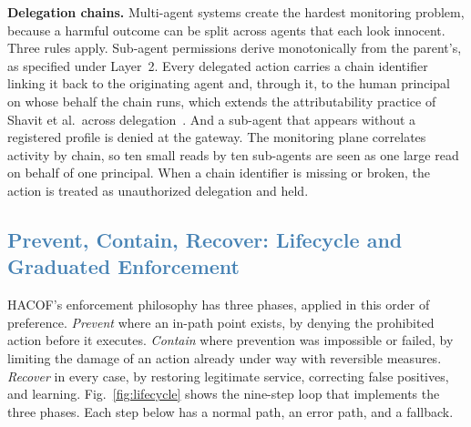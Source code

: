\documentclass[journal]{IEEEtran}
\newcommand{\hacof}{HACOF}
\begin{document}
\textbf{Delegation chains.} Multi-agent systems create the hardest monitoring problem, because a harmful outcome can be split across agents that each look innocent. Three rules apply. Sub-agent permissions derive monotonically from the parent's, as specified under Layer~2. Every delegated action carries a chain identifier linking it back to the originating agent and, through it, to the human principal on whose behalf the chain runs, which extends the attributability practice of Shavit et al.\ across delegation~\cite{shavit2023agentic}.
And a sub-agent that appears without a registered profile is denied at the gateway. The monitoring plane correlates activity by chain, so ten small reads by ten sub-agents are seen as one large read on behalf of one principal. When a chain identifier is missing or broken, the action is treated as unauthorized delegation and held.

\subsection{\textcolor{steelblue}{Prevent, Contain, Recover: Lifecycle and Graduated Enforcement}}
\label{sec:hacof-lifecycle}

\hacof's enforcement philosophy has three phases, applied in this order of preference. \textit{Prevent} where an in-path point exists, by denying the prohibited action before it executes. \textit{Contain} where prevention was impossible or failed, by limiting the damage of an action already under way with reversible measures. \textit{Recover} in every case, by restoring legitimate service, correcting false positives, and learning. Fig.~\ref{fig:lifecycle} shows the nine-step loop that implements the three phases. Each step below has a normal path, an error path, and a fallback.
\end{document}
